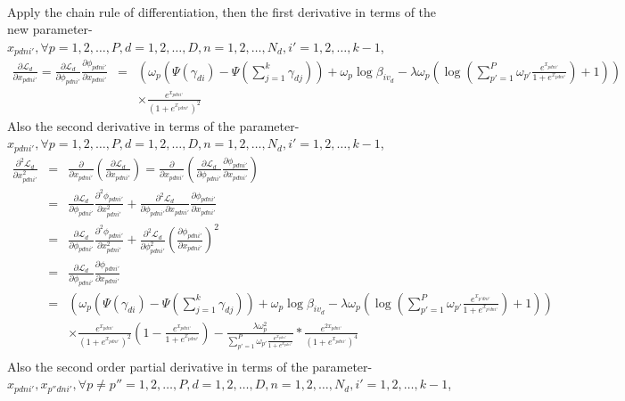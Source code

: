 \documentclass{article}
\newcommand{\be}{\begin{equation}}
\newcommand{\ee}{\end{equation}}
\newcommand{\ba}{\begin{array}}
\newcommand{\ea}{\end{array}}
\begin{document}
\\
Apply the chain rule of differentiation, then the first derivative in terms of the new parameter-$x_{pdni'},\forall p=1,2,\ldots,P,d=1,2,\ldots,D,n=1,2,\ldots,N_d,i'=1,2,\ldots,k-1$,\\
\be
\ba{rcl}
\frac{\partial\mathcal{L}_d}{\partial x_{pdni'}}=\frac{\partial\mathcal{L}_d}{\partial \phi_{pdni'}}\frac{\partial\phi_{pdni'}}{\partial x_{pdni'}}&=&\left(\omega_{p}(\Psi(\gamma_{di})-\Psi(\sum_{j=1}^{k}\gamma_{dj}))+\omega_{p}\log\beta_{iv_d}-\lambda\omega_{p}(\log(\sum_{p'=1}^{P}\omega_{p'}\frac{e^{x_{pdni'}}}{1+e^{x_{pdni'}}})+1)\right)\\
&&\times\frac{e^{x_{pdni'}}}{(1+e^{x_{pdni'}})^2}
\ea
\ee
Also the second derivative in terms of the parameter-$x_{pdni'},\forall p=1,2,\ldots,P,d=1,2,\ldots,D,n=1,2,\ldots,N_d,i'=1,2,\ldots,k-1$,\\
\be
\ba{rcl}
\frac{\partial^2\mathcal{L}_d}{\partial x_{pdni'}^2}&=&\frac{\partial}{\partial x_{pdni'}}\left(\frac{\partial\mathcal{L}_d}{\partial x_{pdni'}}\right)=\frac{\partial}{\partial x_{pdni'}}\left(\frac{\partial\mathcal{L}_d}{\partial \phi_{pdni'}}\frac{\partial\phi_{pdni'}}{\partial x_{pdni'}}\right)\\
&=&\frac{\partial\mathcal{L}_d}{\partial \phi_{pdni'}}\frac{\partial^2\phi_{pdni'}}{\partial x_{pdni'}^2}+\frac{\partial^2\mathcal{L}_d}{\partial \phi_{pdni'}\partial x_{pdni'}}\frac{\partial\phi_{pdni'}}{\partial x_{pdni'}}\\
&=&\frac{\partial\mathcal{L}_d}{\partial \phi_{pdni'}}\frac{\partial^2\phi_{pdni'}}{\partial x_{pdni'}^2}+\frac{\partial^2\mathcal{L}_d}{\partial \phi_{pdni'}^2}(\frac{\partial\phi_{pdni'}}{\partial x_{pdni'}})^2\\
&=&\frac{\partial\mathcal{L}_d}{\partial \phi_{pdni'}}\frac{\partial\phi_{pdni'}}{\partial x_{pdni'}}\\
&=&\left(\omega_{p}(\Psi(\gamma_{di})-\Psi(\sum_{j=1}^{k}\gamma_{dj}))+\omega_{p}\log\beta_{iv_d}-\lambda\omega_{p}(\log(\sum_{p'=1}^{P}\omega_{p'}\frac{e^{x_{p'dni'}}}{1+e^{x_{p'dni'}}})+1)\right)\\
&&\times\frac{e^{x_{pdni'}}}{(1+e^{x_{pdni'}})^2}(1-\frac{e^{x_{pdni'}}}{1+e^{x_{pdni'}}})-\frac{\lambda\omega_p^2}{\sum_{p'=1}^{P}\omega_{p'}\frac{e^{x_{pdni'}}}{1+e^{x_{pdni'}}}}*\frac{e^{2x_{pdni'}}}{(1+e^{x_{pdni'}})^4}\\
\ea
\ee
Also the second order partial derivative in terms of the parameter-$x_{pdni'},x_{p''dni'},\forall p\neq p''=1,2,\ldots,P,d=1,2,\ldots,D,n=1,2,\ldots,N_d,i'=1,2,\ldots,k-1$,\\
\end{document}
